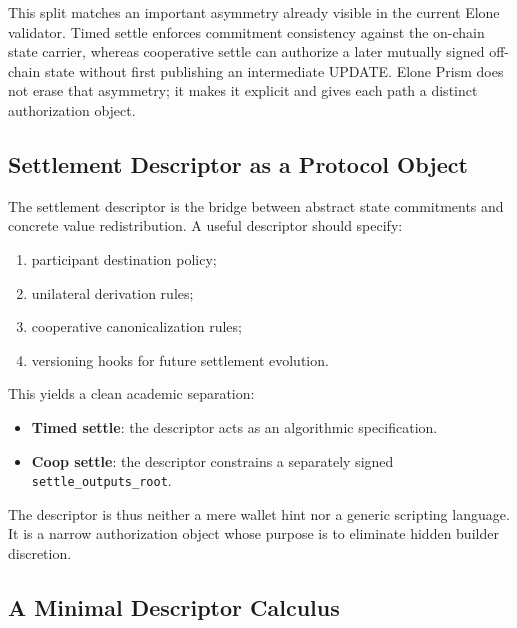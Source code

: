 \documentclass[11pt,a4paper]{article}
\newcommand{\code}[1]{\texttt{#1}}
\begin{document}
This split matches an important asymmetry already visible in the current Elone validator. Timed settle enforces commitment consistency against the on-chain state carrier, whereas cooperative settle can authorize a later mutually signed off-chain state without first publishing an intermediate UPDATE. Elone Prism does not erase that asymmetry; it makes it explicit and gives each path a distinct authorization object.

\subsection{Settlement Descriptor as a Protocol Object}

The settlement descriptor is the bridge between abstract state commitments and concrete value redistribution. A useful descriptor should specify:
\begin{enumerate}
    \item participant destination policy;
    \item unilateral derivation rules;
    \item cooperative canonicalization rules;
    \item versioning hooks for future settlement evolution.
\end{enumerate}

This yields a clean academic separation:
\begin{itemize}
    \item \textbf{Timed settle}: the descriptor acts as an algorithmic specification.
    \item \textbf{Coop settle}: the descriptor constrains a separately signed \code{settle\_outputs\_root}.
\end{itemize}

The descriptor is thus neither a mere wallet hint nor a generic scripting language. It is a narrow authorization object whose purpose is to eliminate hidden builder discretion.

\subsection{A Minimal Descriptor Calculus}
\end{document}
